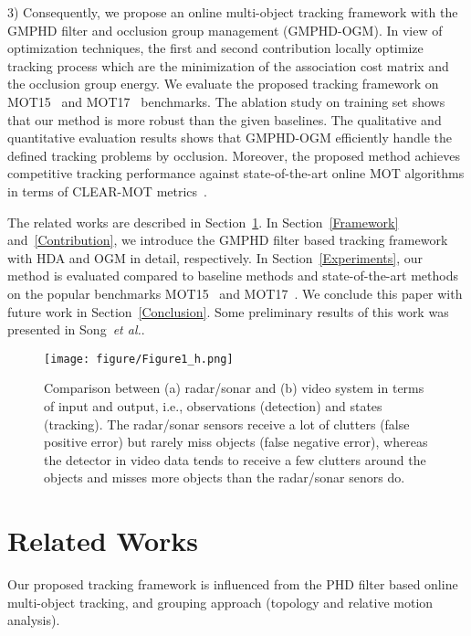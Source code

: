 \documentclass[journal]{IEEEtran}
\newcounter{ct}
\begin{document}
3) Consequently, we propose an online multi-object tracking framework with the GMPHD filter and occlusion group management (GMPHD-OGM). In view of optimization techniques, the first and second contribution locally optimize tracking process which are the minimization of the association cost matrix and the occlusion group energy. 
We evaluate the proposed tracking framework on MOT15~\cite{MOT15} and MOT17~\cite{MOT16} benchmarks. The ablation study on training set shows that our method is more robust than the given baselines. The qualitative and quantitative evaluation results shows that GMPHD-OGM efficiently handle the defined tracking problems by occlusion. Moreover, the proposed method achieves competitive tracking performance against state-of-the-art online MOT algorithms in terms of CLEAR-MOT metrics~\cite{clearmot}. 



The related works are described in Section~\ref{sec:relatedwork}.
In Section~\ref{Framework} and~\ref{Contribution}, we introduce the GMPHD filter based tracking framework with HDA and OGM in detail, respectively.
In Section~\ref{Experiments}, our method is evaluated compared to baseline methods and state-of-the-art methods on the popular benchmarks MOT15~\cite{MOT15} and MOT17~\cite{MOT16}. We conclude this paper with future work in Section~\ref{Conclusion}.
Some preliminary results of this work was presented in Song~\textit{et al.}\cite{prev1,prev2}. 

\begin{figure*}
\centering
\texttt{[image: figure/Figure1\_h.png]}
\caption{Comparison between (a) radar/sonar and (b) video system in terms of input and output, i.e., observations (detection) and states (tracking). 
The radar/sonar sensors receive a lot of clutters (false positive error) but rarely miss objects (false negative error), whereas the detector in video data tends to receive a few clutters around the objects and misses more objects than the radar/sonar senors do.}
\label{fig:domains}
\end{figure*}

\section{Related Works}
\label{sec:relatedwork}

Our proposed tracking framework is influenced from the PHD filter based online multi-object tracking, and grouping approach (topology and relative motion analysis).
\end{document}
